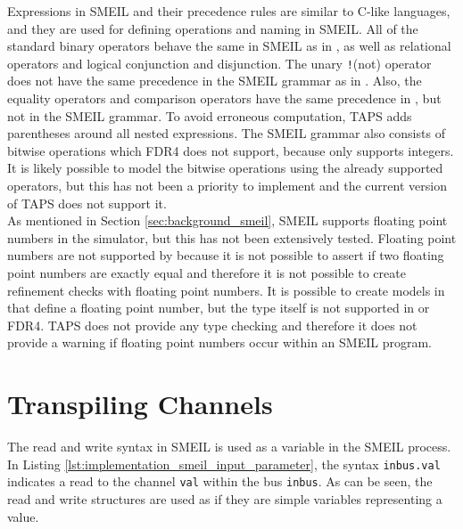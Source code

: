 Expressions in SMEIL and their precedence rules are similar to C-like languages, and they are used for defining operations and naming in SMEIL. All of the standard binary operators behave the same in SMEIL as in \cspm{}, as well as relational operators and logical conjunction and disjunction. The unary \texttt{!}(not) operator does not have the same precedence in the SMEIL grammar as in \cspm{}. Also, the equality operators and comparison operators have the same precedence in \cspm{}, but not in the SMEIL grammar. To avoid erroneous computation, TAPS adds parentheses around all nested expressions. The SMEIL grammar also consists of bitwise operations which FDR4 does not support, because \cspm{} only supports integers. It is likely possible to model the bitwise operations using the already supported operators, but this has not been a priority to implement and the current version of TAPS does not support it.\\

As mentioned in Section \ref{sec:background_smeil}, SMEIL supports floating point numbers in the simulator, but this has not been extensively tested. Floating point numbers are not supported by \cspm{} because it is not possible to assert if two floating point numbers are exactly equal and therefore it is not possible to create refinement checks with floating point numbers. It is possible to create models in \cspm{} that define a floating point number, but the type itself is not supported in \cspm{} or FDR4. TAPS does not provide any type checking and therefore it does not provide a warning if floating point numbers occur within an SMEIL program.
\section{Transpiling Channels}
 The read and write syntax in SMEIL is used as a variable in the SMEIL process. In Listing \ref{lst:implementation_smeil_input_parameter}, the syntax \texttt{inbus.val} indicates a read to the channel \texttt{val} within the bus \texttt{inbus}. As can be seen, the read and write structures are used as if they are simple variables representing a value.\\

